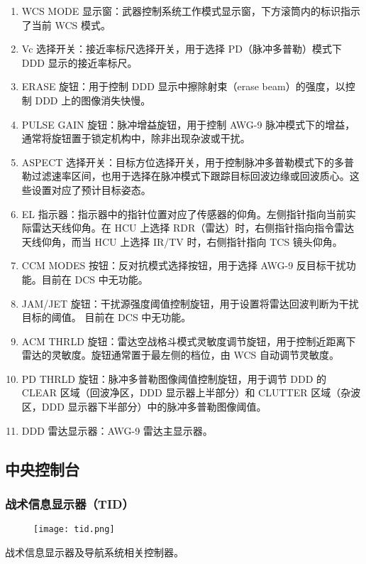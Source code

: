 \begin{enumerate}
	\item WCS MODE 显示窗：武器控制系统工作模式显示窗，下方滚筒内的标识指示了当前 WCS 模式。
	\item Vc 选择开关：接近率标尺选择开关，用于选择 PD（脉冲多普勒）模式下 DDD 显示的接近率标尺。
	\item ERASE 旋钮：用于控制 DDD 显示中擦除射束（erase beam）的强度，以控制 DDD 上的图像消失快慢。
	\item PULSE GAIN 旋钮：脉冲增益旋钮，用于控制 AWG-9 脉冲模式下的增益，通常将旋钮置于锁定机构中，除非出现杂波或干扰。
	\item ASPECT 选择开关：目标方位选择开关，用于控制脉冲多普勒模式下的多普勒过滤速率区间，也用于选择在脉冲模式下跟踪目标回波边缘或回波质心。这些设置对应了预计目标姿态。
	\item EL 指示器：指示器中的指针位置对应了传感器的仰角。左侧指针指向当前实际雷达天线仰角。在 HCU 上选择 RDR（雷达）时，右侧指针指向指令雷达天线仰角，而当 HCU 上选择 IR/TV 时，右侧指针指向 TCS 镜头仰角。
	\item CCM MODES 按钮：反对抗模式选择按钮，用于选择 AWG-9 反目标干扰功能。目前在 DCS 中无功能。
	\item JAM/JET 旋钮：干扰源强度阈值控制旋钮，用于设置将雷达回波判断为干扰目标的阈值。 目前在 DCS 中无功能。
	\item ACM THRLD 旋钮：雷达空战格斗模式灵敏度调节旋钮，用于控制近距离下雷达的灵敏度。旋钮通常置于最左侧的档位，由 WCS 自动调节灵敏度。
	\item PD THRLD 旋钮：脉冲多普勒图像阈值控制旋钮，用于调节 DDD 的 CLEAR 区域（回波净区，DDD 显示器上半部分）和 CLUTTER 区域（杂波区，DDD 显示器下半部分）中的脉冲多普勒图像阈值。
	\item DDD 雷达显示器：AWG-9 雷达主显示器。
\end{enumerate}

\subsection{中央控制台}

\subsubsection{战术信息显示器（TID）}
\begin{figure}[htb]
	\centering
	\texttt{[image: tid.png]}
\end{figure}
战术信息显示器及导航系统相关控制器。

